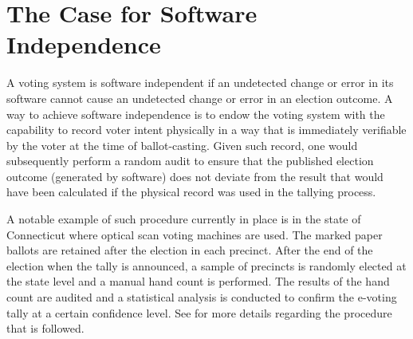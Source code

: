 \section{The Case for Software Independence}

A voting system is software independent if an undetected change or
error in its software cannot cause an undetected change or error in an
election outcome.  A way to achieve software independence is to endow
the voting system with the capability to record voter intent
physically in a way that is immediately verifiable by the voter at the
time of ballot-casting. Given such record, one would subsequently
perform a random audit to ensure that the published election outcome
(generated by software) does not deviate from the result that would
have been calculated if the physical record was used in the tallying
process.

A notable example of such procedure currently in place is in the state
of Connecticut where optical scan voting machines are used. The marked
paper ballots are retained after the election in each precinct. After
the end of the election when the tally is announced, a sample of
precincts is randomly elected at the state level and a manual hand
count is performed. The results of the hand count are audited and a
statistical analysis is conducted to confirm the e-voting tally at a
certain confidence level.  See \cite{connecticut-audit} for more
details regarding the procedure that is followed.



